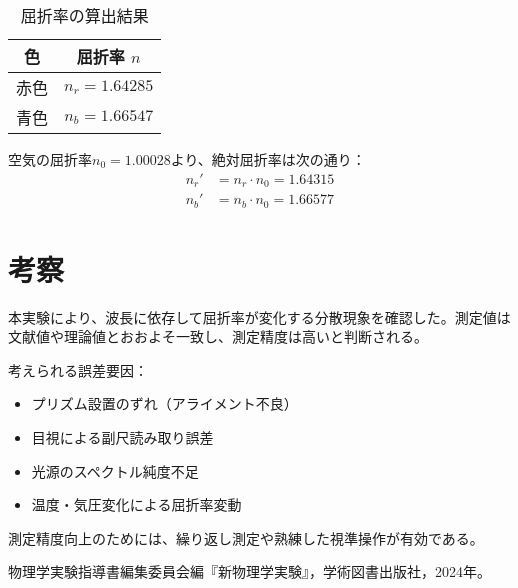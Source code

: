 \documentclass[a4paper,11pt,dvipdfmx]{jsarticle}
\begin{document}
\begin{table}[H]
\centering
\caption{屈折率の算出結果}
\label{tab:refractive_index}
\begin{tabular}{|c|c|}
\hline
色 & 屈折率 $n$ \\
\hline
赤色 & $n_r = 1.64285$ \\
\hline
青色 & $n_b = 1.66547$ \\
\hline
\end{tabular}
\end{table}

空気の屈折率$n_0 = 1.00028$より、絶対屈折率は次の通り：
\begin{align*}
n_r' &= n_r \cdot n_0 = 1.64315 \\
n_b' &= n_b \cdot n_0 = 1.66577
\end{align*}

\section{考察}
本実験により、波長に依存して屈折率が変化する分散現象を確認した。測定値は文献値や理論値とおおよそ一致し、測定精度は高いと判断される。

考えられる誤差要因：
\begin{itemize}
  \item プリズム設置のずれ（アライメント不良）
  \item 目視による副尺読み取り誤差
  \item 光源のスペクトル純度不足
  \item 温度・気圧変化による屈折率変動
\end{itemize}

測定精度向上のためには、繰り返し測定や熟練した視準操作が有効である。

\begin{thebibliography}{9}
物理学実験指導書編集委員会編『新物理学実験』，学術図書出版社，2024年。
\end{thebibliography}
\end{document}
